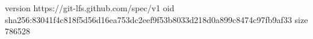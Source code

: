 version https://git-lfs.github.com/spec/v1
oid sha256:83041f4c818f5d56d16ea753dc2eef9f53b8033d218d0a899c8474c97fb9af33
size 786528
